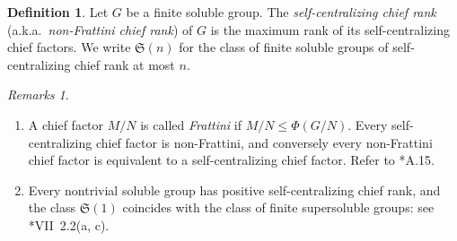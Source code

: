 \documentclass[11pt,reqno]{amsart}
\numberwithin{equation}{section}
\newtheorem{lemma}[theorem]{Lemma}
\theoremstyle{definition}
\newtheorem{definition}[theorem]{Definition}
\theoremstyle{remark}
\newtheorem*{remarks}{Remarks}
\def\F{\mathbf{F}}
\def\nsgp{\trianglelefteq}
\def\FS{\mathfrak{S}}
\numberwithin{equation}{section}
\begin{document}
%

\begin{definition}
    Let $G$ be a finite soluble group.
    The \emph{self-centralizing chief rank}
    (a.k.a.~\emph{non-Frattini chief rank})
    of $G$ is the maximum rank of its self-centralizing chief factors.
    We write $\FS(n)$ for the class of finite soluble groups of self-centralizing chief rank at most $n$.
\end{definition}

\begin{remarks}\leavevmode
    \begin{enumerate}[1.]
        \item A chief factor $M / N$ is called \emph{Frattini} if $M / N \le \Phi(G / N)$. Every self-centralizing chief factor is non-Frattini, and conversely every non-Frattini chief factor is equivalent to a self-centralizing chief factor.
        Refer to \cite{doerk-hawkes}*{A.15}.
        \item Every nontrivial soluble group has positive self-centralizing chief rank, and the class $\FS(1)$ coincides with the class of finite supersoluble groups: see \cite{doerk-hawkes}*{VII~2.2(a, c)}.
    \end{enumerate}
\end{remarks}
\end{document}
